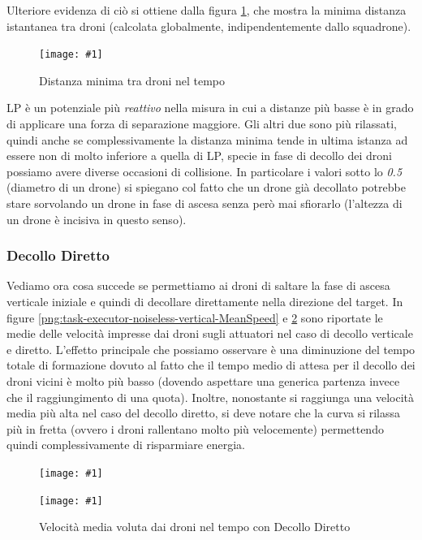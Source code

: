\documentclass[a4paper,11pt,oneside, table]{article}
\newcommand{\putimage}[4] {
	\begin{figure}[H]
	    \centering
	    \texttt{[image: \#1]}
	    \caption{#2}\label{#3}
	\end{figure}
}
\newcommand{\putsubimage}[5] {
  \begin{minipage}{{#4}\linewidth}
	    \centering
      \texttt{[image: \#1]}
	    \caption{#2}\label{#3}
	\end{minipage}
}
\newcommand{\putimagecouple}[2] {
  \begin{figure}[!htb]
      \centering
      #1
      \hspace{0.5cm}
      #2
  \end{figure}
}
\begin{document}
Ulteriore evidenza di ci\`o si ottiene dalla figura \ref{png:task-executor-noiseless-vertical-MinDistancesGlobally}, che mostra la minima distanza istantanea tra droni (calcolata globalmente, indipendentemente dallo squadrone).

\putimage{images/experiments/task-executor-noiseless-vertical/MinDistancesGlobally.png}{Distanza minima tra droni nel tempo}{png:task-executor-noiseless-vertical-MinDistancesGlobally}{0.99}

LP \`e un potenziale pi\`u \textit{reattivo} nella misura in cui a distanze pi\`u basse \`e in grado di applicare una forza di separazione maggiore. Gli altri due sono pi\`u rilassati, quindi anche se complessivamente la distanza minima tende in ultima istanza ad essere non di molto inferiore a quella di LP, specie in fase di decollo dei droni possiamo avere diverse occasioni di collisione.
In particolare i valori sotto lo \textit{0.5} (diametro di un drone) si spiegano col fatto che un drone gi\`a decollato potrebbe stare sorvolando un drone in fase di ascesa senza per\`o mai sfiorarlo (l'altezza di un drone \`e incisiva in questo senso).

\subsubsection{Decollo Diretto}

Vediamo ora cosa succede se permettiamo ai droni di saltare la fase di ascesa verticale iniziale e quindi di decollare direttamente nella direzione del target.
In figure \ref{png:task-executor-noiseless-vertical-MeanSpeed} e \ref{png:task-executor-noiseless-direct-MeanSpeed} sono riportate le medie delle velocit\`a impresse dai droni sugli attuatori nel caso di decollo verticale e diretto.
L'effetto principale che possiamo osservare \`e una diminuzione del tempo totale di formazione dovuto al fatto che il tempo medio di attesa per il decollo dei droni vicini \`e molto pi\`u basso (dovendo aspettare una generica partenza invece che il raggiungimento di una quota).
Inoltre, nonostante si raggiunga una velocit\`a media pi\`u alta nel caso del decollo diretto, si deve notare che la curva si rilassa pi\`u in fretta (ovvero i droni rallentano molto pi\`u velocemente) permettendo quindi complessivamente di risparmiare energia.

\putimagecouple
{\putsubimage{images/experiments/task-executor-noiseless-vertical/MeanSpeed.png}{Velocit\`a media voluta dai droni nel tempo con Decollo Verticale}{png:task-executor-noiseless-vertical-MeanSpeed}{0.4}{0.99}}
{\putsubimage{images/experiments/task-executor-noiseless-direct/MeanSpeed.png}{Velocit\`a media voluta dai droni nel tempo con Decollo Diretto}{png:task-executor-noiseless-direct-MeanSpeed}{0.4}{0.99}}
\end{document}
